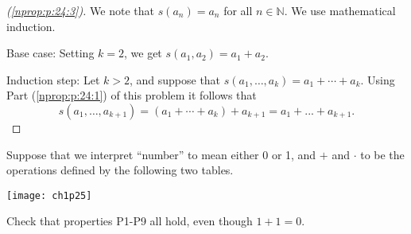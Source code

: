 \begin{proof}[(\ref{nprop:p:24:3})]
	We note that $s(a_n) = a_n$ for all $n \in \mathbb{N}$. We use mathematical induction.

	Base case: Setting $k = 2$, we get $s(a_1, a_2) = a_1 + a_2$.

	Induction step: Let $k > 2$, and suppose that $s(a_1, \ldots, a_k) = a_1 + \cdots + a_k$. Using Part (\ref{nprop:p:24:1}) of this problem it follows that
	$$
		s(a_1, \ldots, a_{k + 1}) = (a_1 + \cdots + a_k) + a_{k + 1} = a_1 + ... + a_{k + 1}.
	$$
\end{proof}


\Newpage
\begin{problem} %
	Suppose that we interpret ``number'' to mean either 0 or 1, and $+$ and $\cdot$ to be the operations defined by the following two tables.

	\begin{center}
		\texttt{[image: ch1p25]}
	\end{center}
	Check that properties P1-P9 all hold, even though $1 + 1 = 0$.
\end{problem}

